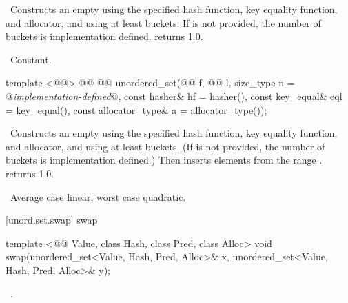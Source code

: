 \documentclass[american,twoside]{book}
\begin{document}
\begin{itemdescr}
\pnum
\effects\ Constructs an empty  using the
specified hash function, key equality function, and allocator, and
using at least \textit{} buckets.  If \textit{} is not
provided, the number of buckets is implementation
defined.   returns 1.0.

\pnum
\complexity\ Constant.
\end{itemdescr}

%
\begin{itemdecl}
template <@@>
  @@
          @@
  unordered_set(@@ f, @@ l,
                size_type n = @\textit{implementation-defined}@,
                const hasher& hf = hasher(),
                const key_equal& eql = key_equal(),
                const allocator_type& a = allocator_type());
\end{itemdecl}

\begin{itemdescr}
\pnum
\effects\ Constructs an empty  using the
specified hash function, key equality function, and allocator, and
using at least \textit{} buckets.  (If \textit{} is not
provided, the number of buckets is implementation defined.)  Then
inserts elements from the range \tcode{[\textit{f}, \textit{l})}.
 returns 1.0.

\pnum
\complexity\ Average case linear, worst case quadratic.
\end{itemdescr}

[unord.set.swap]{ swap}

%
%
\begin{itemdecl}
template <@@ Value, class Hash, class Pred, class Alloc>
  void swap(unordered_set<Value, Hash, Pred, Alloc>& x,
            unordered_set<Value, Hash, Pred, Alloc>& y);
\end{itemdecl}

\begin{itemdescr}
\pnum\effects\ .
\end{itemdescr}
\end{document}
